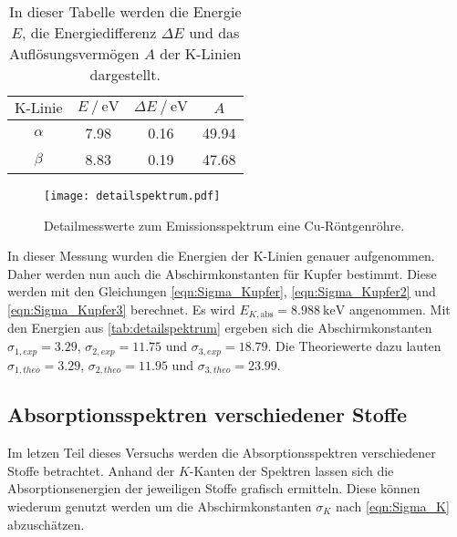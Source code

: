 \begin{table}
    \centering
    \caption{In dieser Tabelle werden die Energie $E$, die Energiedifferenz $\Delta E$ und das Auflösungsvermögen $A$ der K-Linien dargestellt.}
    \label{tab:detailspektrum}
    \begin{tabular}{c S[table-format = 1.2] S[table-format = 1.2] S[table-format = 2.2]}
      \toprule
       {$\text{K-Linie}$} & {$E \mathbin{/} \unit{\electronvolt}$} & {$\Delta E \mathbin{/} \unit{\electronvolt}$} & {$A$}\\
      \midrule
        {$\alpha$} & 7.98 & 0.16 & 49.94 \\
        {$\beta$}  & 8.83 & 0.19 & 47.68 \\
      \bottomrule
    \end{tabular}
\end{table}

\begin{figure}
    \centering
    \texttt{[image: detailspektrum.pdf]}
    \caption{Detailmesswerte zum Emissionsspektrum eine Cu-Röntgenröhre.}
    \label{fig:detail}
\end{figure}

In dieser Messung wurden die Energien der K-Linien genauer aufgenommen. Daher werden nun auch die Abschirmkonstanten für Kupfer bestimmt. Diese werden mit den Gleichungen 
\eqref{eqn:Sigma_Kupfer}, \eqref{eqn:Sigma_Kupfer2} und \eqref{eqn:Sigma_Kupfer3} berechnet. Es wird $E_{K,\text{abs}} = \qty{8.988}{\kilo\electronvolt}$
angenommen. Mit den Energien aus \autoref{tab:detailspektrum} ergeben sich die Abschirmkonstanten $\sigma_{1,exp} = 3.29$, $\sigma_{2,exp} = 11.75$ und 
$\sigma_{3,exp} = 18.79$. Die Theoriewerte dazu lauten $\sigma_{1,theo} = 3.29$, $\sigma_{2,theo} = 11.95$ und 
$\sigma_{3,theo} = 23.99$.

\subsection{Absorptionsspektren verschiedener Stoffe}
\label{subsec:Absorption}
Im letzen Teil dieses Versuchs werden die Absorptionsspektren verschiedener Stoffe betrachtet. Anhand der $K$-Kanten der Spektren lassen sich die Absorptionsenergien 
der jeweiligen Stoffe grafisch ermitteln. Diese können wiederum genutzt werden um die Abschirmkonstanten $\sigma_K$ nach \autoref{eqn:Sigma_K} abzuschätzen.

